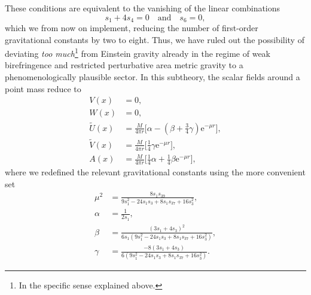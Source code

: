 These conditions are equivalent to the vanishing of the linear combinations
\begin{equation}
  s_1 + 4 s_4 = 0\quad\text{and}\quad s_6 = 0,
\end{equation}
which we from now on implement, reducing the number of first-order gravitational constants by two to eight. Thus, we have ruled out the possibility of deviating \emph{too much}\footnote{In the specific sense explained above.} from Einstein gravity already in the regime of weak birefringence and restricted perturbative area metric gravity to a phenomenologically plausible sector. In this subtheory, the scalar fields around a point mass reduce to
\begin{equation}\label{linearized_schwarzschild_solution}
  \begin{aligned}
    V(x) &{} = 0, \\
    W(x) &{} = 0, \\
    \tilde U(x) &{} = \frac{M}{4\pi r} \big\lbrack \alpha - (\beta + \frac{3}{4}\gamma)\mathrm e^{-\mu r}\big\rbrack, \\
    \tilde V(x) &{} = \frac{M}{4\pi r} \big\lbrack \frac{1}{4}\gamma \mathrm e^{-\mu r}\big\rbrack, \\
    A (x) &{} = \frac{M}{4\pi r} \big\lbrack \frac{1}{4} \alpha + \frac{1}{4} \beta \mathrm e^{-\mu r}\big\rbrack,
  \end{aligned}
\end{equation}
where we redefined the relevant gravitational constants using the more convenient set
\begin{equation}\label{schwarzschild_constants}
  \begin{aligned}
    \mu^2 &{} = \frac{8s_1s_{39}}{9s_1^2 - 24s_1s_3 + 8s_1s_{37} + 16s_3^2}, \\
    \alpha &{} = \frac{1}{2s_1}, \\
    \beta &{} = \frac{(3s_1 + 4s_3)^2}{6s_1(9s_1^2 - 24s_1s_3 + 8s_1s_{37} + 16s_3^2)}, \\
    \gamma &{} = \frac{-8(3s_1 + 4s_3)}{6(9s_1^2 - 24s_1s_3 + 8s_1s_{37} + 16s_3^2)}.
  \end{aligned}
\end{equation}

